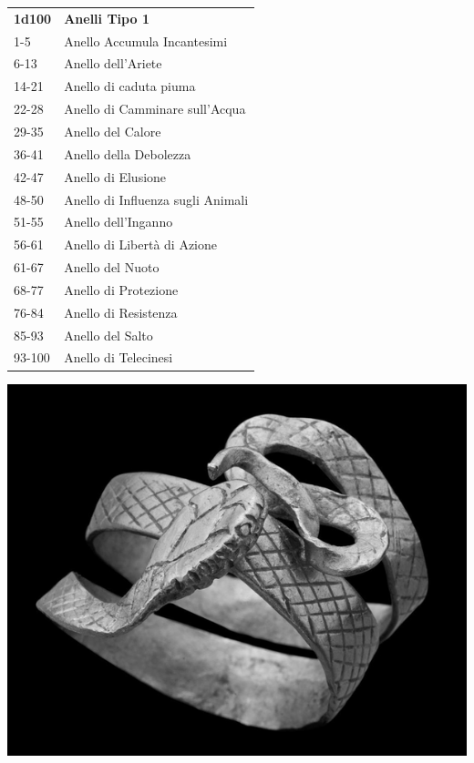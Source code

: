 \begin{multicols}{2}
	\medskip

	\begin{tabular}{ll}
		\textbf{1d100} & \textbf{Anelli Tipo 1}\\
		1-5   & Anello Accumula Incantesimi\\
		6-13  & Anello dell'Ariete\\
		14-21 & Anello di caduta piuma\\
		22-28 & Anello di Camminare sull'Acqua\\
		29-35 & Anello del Calore\\
		36-41 & Anello della Debolezza\\
		42-47 & Anello di Elusione\\
		48-50 & Anello di Influenza sugli Animali\\
		51-55 & Anello dell’Inganno\\
		56-61 & Anello di Libertà di Azione\\
		61-67 & Anello del Nuoto\\
		68-77 & Anello di Protezione\\
		76-84 & Anello di Resistenza\\
		85-93 & Anello del Salto\\
		93-100 & Anello di Telecinesi\\
	\end{tabular}

	\medskip

	\begin{center}
		\includegraphics[width=0.8\linewidth]{immagini/romanring.png}
	\end{center}


\end{multicols}

